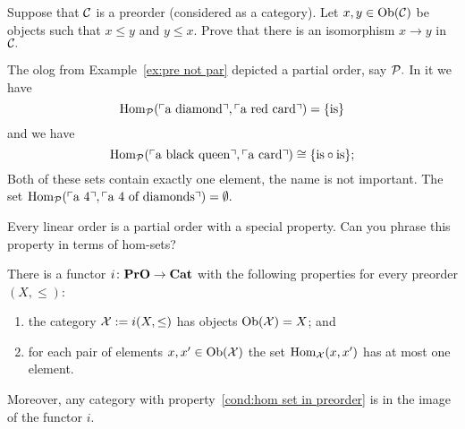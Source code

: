 \documentclass[../main/CT4S-EN-RU]{subfiles}
\begin{document}
\begin{exerciseRUS}
\end{exerciseRUS}

\begin{exerciseENG}
Suppose that $\mathcal{C}$ is a preorder (considered as a category). Let $x,y\in\operatorname{Ob}(\mathcal{C})$ be objects such that $x\leq y$ and $y\leq x.$ Prove that there is an isomorphism $x\to y$ in $\mathcal{C}.$
\end{exerciseENG}

\begin{exerciseRUS}
\end{exerciseRUS}

\begin{exampleENG}
The olog from Example~\ref{ex:pre not par} depicted a partial order, say $\mathcal{P}.$ In it we have $$\operatorname{Hom}_\mathcal{P}(\textnormal{$\ulcorner$a diamond$\urcorner$},\textnormal{$\ulcorner$a red card$\urcorner$})=\{\textnormal{is}\}$$ and we have $$\operatorname{Hom}_\mathcal{P}(\textnormal{$\ulcorner$a black queen$\urcorner$},\textnormal{$\ulcorner$a card$\urcorner$})\cong\{\textnormal{is}\circ\textnormal{is}\};$$ Both of these sets contain exactly one element, the name is not important. The set $\operatorname{Hom}_\mathcal{P}(\textnormal{$\ulcorner$a 4$\urcorner$},\textnormal{$\ulcorner$a 4 of diamonds$\urcorner$})=\emptyset.$ 
\end{exampleENG}

\begin{exampleRUS}
\end{exampleRUS}

\begin{exerciseENG}
Every linear order is a partial order with a special property. Can you phrase this property in terms of hom-sets?
\end{exerciseENG}

\begin{exerciseRUS}
\end{exerciseRUS}

\begin{propositionENG}\label{prop:preorders to cats}
There is a functor $i\colon{\mathbf{PrO}}\rightarrow{\mathbf{Cat}}$ with the following properties for every preorder $(X,\leq)$:
\begin{enumerate}
\item the category $\mathcal{X}:=i(X,\leq)$ has objects $\operatorname{Ob}(\mathcal{X})=X$; and
\item \label{cond:hom set in preorder} for each pair of elements $x,x'\in\operatorname{Ob}(\mathcal{X})$ the set $\operatorname{Hom}_\mathcal{X}(x,x')$ has at most one element.
\end{enumerate}
Moreover, any category with property~\ref{cond:hom set in preorder} is in the image of the functor $i.$
\end{propositionENG}
\end{document}

